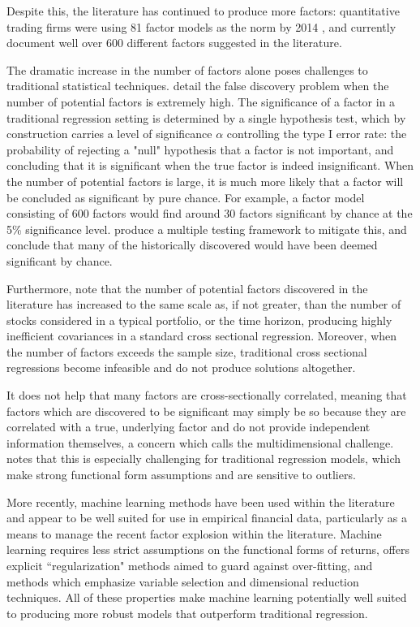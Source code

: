 \documentclass[11pt, a4paper, table]{article}
\begin{document}
Despite this, the literature has continued to produce more factors: quantitative trading firms were using 81 factor models as the norm by 2014 \citep{hsu_finding_2014}, and \cite{harvey_census_2019} currently document well over 600 different factors suggested in the literature. 

The dramatic increase in the number of factors alone poses challenges to traditional statistical techniques. \cite{harvey__2016} detail the false discovery problem when the number of potential factors is extremely high. The significance of a factor in a traditional regression setting is determined by a single hypothesis test, which by construction carries a level of significance $\alpha$ controlling the type I error rate: the probability of rejecting a "null" hypothesis that a factor is not important, and concluding that it is significant when the true factor is indeed insignificant. When the number of potential factors is large, it is much more likely that a factor will be concluded as significant by pure chance. For example, a factor model consisting of 600 factors would find around 30 factors significant by chance at the 5\% significance level. \cite{harvey__2016} produce a multiple testing framework to mitigate this, and conclude that many of the historically discovered would have been deemed significant by chance.

Furthermore, \cite{feng_taming_2019} note that the number of potential factors discovered in the literature has increased to the same scale as, if not greater, than the number of stocks considered in a typical portfolio, or the time horizon, producing highly inefficient covariances in a standard cross sectional regression. Moreover, when the number of factors exceeds the sample size, traditional cross sectional regressions become infeasible and do not produce solutions altogether. 

It does not help that many factors are cross-sectionally correlated, meaning that factors which are discovered to be significant may simply be so because they are correlated with a true, underlying factor and do not provide independent information themselves, a concern which \cite{cochrane_presidential_2011} calls the multidimensional challenge. \cite{freyberger_dissecting_2017} notes that this is especially challenging for traditional regression models, which make strong functional form assumptions and are sensitive to outliers. 

More recently, machine learning methods have been used within the literature and appear to be well suited for use in empirical financial data, particularly as a means to manage the recent factor explosion within the literature. Machine learning requires less strict assumptions on the functional forms of returns, offers explicit ``regularization" methods aimed to guard against over-fitting, and methods which emphasize variable selection and dimensional reduction techniques. All of these properties make machine learning potentially well suited to producing more robust models that outperform traditional regression.
\end{document}
